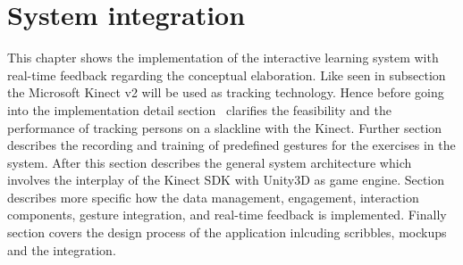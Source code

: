 \chapter{System integration}\label{5_systemIntegration}
This chapter shows the implementation of the interactive learning system with real-time feedback regarding the conceptual elaboration. Like seen in subsection ~\textit{} the Microsoft Kinect v2 will be used as tracking technology. Hence before going into the implementation detail section~\textit{} clarifies the feasibility and the performance of tracking persons on a slackline with the Kinect. Further section \textit{} describes the recording and training of predefined gestures for the exercises in the system. After this section  describes the general system architecture which involves the interplay of the Kinect SDK with Unity3D as game engine. Section  describes more specific how the data management, engagement, interaction components, gesture integration, and real-time feedback is implemented. Finally section  covers the design process of the application inlcuding scribbles, mockups and the integration.




